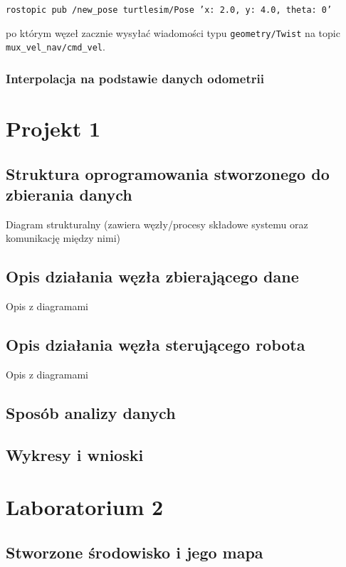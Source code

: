 \documentclass{mwrep}
\begin{document}
\begin{center}
    \texttt{rostopic pub /new\_{}pose turtlesim/Pose '{x: 2.0, y: 4.0, theta: 0}'}
\end{center}

po którym węzeł zacznie wysyłać wiadomości typu \texttt{geometry/Twist} na topic 
\texttt{mux\_{}vel\_{}nav/cmd\_{}vel}.

\newpage

\subsection{Interpolacja na podstawie danych odometrii}



\chapter{Projekt 1}

\section{Struktura oprogramowania stworzonego do zbierania danych}
Diagram strukturalny (zawiera węzły/procesy składowe systemu oraz komunikację między
nimi)
\section{Opis działania węzła zbierającego dane}
Opis z diagramami
\section{Opis działania węzła sterującego robota}
Opis z diagramami
\section{Sposób analizy danych}

\section{Wykresy i wnioski}


\chapter{Laboratorium 2}

\section{Stworzone środowisko i jego mapa}
\end{document}
